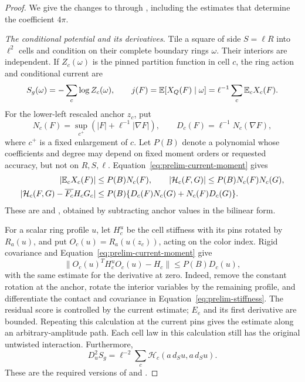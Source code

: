 \begin{proof}
We give the changes to  through
, including the estimates that determine the
coefficient $4\pi$.

\smallskip\noindent
\emph{The conditional potential and its derivatives.}
Tile a square of side $S=\ell R$ into $\ell^2$ cells and condition on
their complete boundary rings $\omega$.
Their interiors are independent. If $Z_c(\omega)$ is the pinned
partition function in cell $c$, the ring action and conditional current
are
\[
 S_g(\omega)=-\sum_c\log Z_c(\omega),\qquad
 j(F)=\mathbb E[X_Q(F)\mid\omega]
     =\ell^{-1}\sum_c\mathbb E_cX_c(F).
\]
For the lower-left rescaled anchor $z_c$, put
\[
 N_c(F)=\sup_{c^+}(|F|+\ell^{-1}|\nabla F|),\qquad
 D_c(F)=\ell^{-1}N_c(\nabla F),
\]
where $c^+$ is a fixed enlargement of $c$. Let $P(B)$ denote a
polynomial whose coefficients and degree may depend on fixed moment
orders or requested accuracy, but not on $R,S,\ell$.
Equation~\eqref{eq:prelim-current-moment} gives
\begin{align}
 |\mathbb E_cX_c(F)|&\le P(B)N_c(F),\qquad
 |\mathcal H_c(F,G)|\le P(B)N_c(F)N_c(G),
 \label{eq:prelim-cell-bounds}\\
 |\mathcal H_c(F,G)-\overline{F_c}H_cG_c|
 &\le P(B)\{D_c(F)N_c(G)+N_c(F)D_c(G)\}.
 \label{eq:prelim-cell-replacement}
\end{align}
These are  and , obtained by
subtracting anchor values in the bilinear form.

For a scalar ring profile $u$, let $H_c^u$ be the cell stiffness with
its pins rotated by $R_a(u)$, and put $O_c(u)=R_a(u(z_c))$, acting on
the color index. Rigid covariance and
Equation~\eqref{eq:prelim-current-moment} give
\begin{equation}
 \|O_c(u)^TH_c^uO_c(u)-H_c\|\le P(B)D_c(u),
 \label{eq:prelim-anchor}
\end{equation}
with the same estimate for the derivative at zero. Indeed, remove the
constant rotation at the anchor, rotate the interior variables by the
remaining profile, and differentiate the contact and covariance in
Equation~\eqref{eq:prelim-stiffness}. The residual score is controlled
by the current estimate; $E_e$ and its first derivative are bounded.
Repeating this calculation at the current pins gives the estimate
along an arbitrary-amplitude path. Each cell law in this calculation
still has the original untwisted interaction. Furthermore,
\begin{equation}
 D_u^2S_g=\ell^{-2}\sum_c
 \mathcal H_c(a\,d_Su,a\,d_Su).
 \label{eq:prelim-ring-hessian}
\end{equation}
These are the required versions of  and
.


\end{proof}
